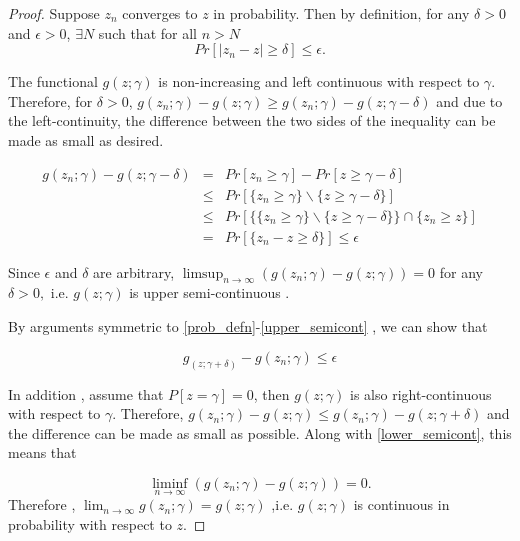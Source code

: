 \documentclass[12pt]{article} %
\begin{document}
\begin{proof}
Suppose $z_n$ converges to $z$ in probability. Then by definition, for any  $\delta>0$ and  $\epsilon>0$, $\exists	N$ such that for all   $n>N$ 
$$ Pr\left[\left|z_n-z\right| \geq \delta \right] \leq \epsilon.$$

 The functional  $g(z;\gamma)$ is  non-increasing and left continuous with respect to $\gamma$. Therefore, for $\delta>0$, 
$g(z_n;\gamma) -g(z;\gamma) \geq g(z_n;\gamma) -g(z;\gamma-\delta) $ and due to the left-continuity, the difference between the two sides of the inequality can be made as small as desired.

\begin{eqnarray}
g(z_n;\gamma) - g(z;\gamma-\delta) & = &Pr\left[z_n\geq \gamma \right] -Pr\left[z \geq  \gamma - \delta \right] \label{prob_defn}\\
& \leq &  Pr\left[\{z_n \geq \gamma \} \backslash \{z \geq \gamma - \delta \} \right] \label{set_diff}\\
& \leq & Pr\left[\{\{z_n \geq \gamma \} \backslash \{z \geq \gamma - \delta \} \} \cap \{z_n \geq  z\} \right] \label{conjunct_with_set} \\
& =  & Pr\left[\{z_n - z \geq \delta \} \right] \leq \epsilon \label{upper_semicont}
\end{eqnarray}
 
Since $\epsilon$ and $\delta$ are arbitrary,
 $ \limsup_{n \rightarrow \infty} ( {g(z_n;\gamma)}- g(z;\gamma) ) =  0$ for any $\delta>0, $ i.e. $g(z;\gamma)$ is upper semi-continuous .

By arguments  symmetric to  \eqref{prob_defn}-\eqref{upper_semicont} , we can show that

\begin{equation}
g_(z;\gamma+\delta) - g(z_n;\gamma) \leq \epsilon \label{lower_semicont}
\end{equation}


In addition , assume that  $P\left[z = \gamma \right]=0$, then $g(z;\gamma)$ is also right-continuous with respect to $\gamma$. Therefore, 
$g(z_n;\gamma) -g(z;\gamma) \leq g(z_n;\gamma) -g(z;\gamma+\delta)$ and the difference can be made as small as possible. Along with \ref{lower_semicont}, this means that

 \[ 
\liminf_{n \rightarrow \infty} ( {g(z_n;\gamma)}- g(z;\gamma) ) = 0. 
\] Therefore , $\lim_{n\rightarrow \infty}g(z_n;\gamma) = g(z;\gamma)$ ,i.e. $g(z;\gamma)$ is continuous in probability with respect to $z$.
\end{proof}
\end{document}
